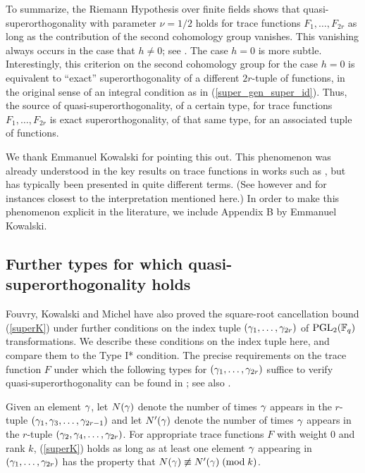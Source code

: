 \documentclass[oneside,11pt]{amsart}
\begin{document}
To summarize, the Riemann Hypothesis over finite fields  shows that quasi-superorthogonality with parameter $\nu=1/2$ holds for trace functions $F_1,\ldots, F_{2r}$ as long as the contribution of the second cohomology group vanishes. This vanishing always occurs  in the case that $h\neq 0$; see \cite[\S 4]{FKM15}. The case $h=0$ is more subtle.
Interestingly, this criterion on the second cohomology group  for the case $h=0$ is  equivalent to ``exact'' superorthogonality of a different $2r$-tuple of functions,  in the original sense of an integral condition as in (\ref{super_gen_super_id}).
 Thus, the source of quasi-superorthogonality, of a certain type, for  trace functions $F_1,\ldots, F_{2r}$ is exact superorthogonality, of that same type, for an associated tuple of functions.

 
We thank Emmanuel Kowalski for pointing this out. This phenomenon was already understood in the key results on trace functions in works such as \cite{KowRic14, FGKM14, FKM15,FKMS19}, but has typically been presented in quite different terms. 
(See  however  \cite[Remark 4.2 and Prop. 4.4.]{KowRic14} and \cite[Prop. 3.2]{FGKM14} for instances closest to the interpretation mentioned here.)
In order to make this phenomenon explicit in the literature, we include Appendix B by Emmanuel Kowalski.

 




 \subsection{Further types for which quasi-superorthogonality holds}
 Fouvry, Kowalski and Michel \cite{FKM15}   have also proved the square-root cancellation bound (\ref{superK}) under further conditions on the index tuple $(\gamma_1,\ldots, \gamma_{2r})$ of $\mathrm{PGL}_2(\mathbb{F}_q)$ transformations. We describe these conditions on the index tuple here, and compare them to the Type I* condition. The precise requirements on the trace function $F$ under which the following types for $(\gamma_1,\ldots,\gamma_{2r})$ suffice to verify  quasi-superorthogonality can be found in \cite[Thm. 1.5 and Cor. 1.6]{FKM15}; see also \cite[\S 14.1]{FKMS19}. 
 
 
Given an element $\gamma$, let $N(\gamma)$ denote the number of times $\gamma$ appears in the $r$-tuple $(\gamma_1,\gamma_3, \ldots, \gamma_{2r-1})$ and let $N'(\gamma)$ denote the number of times $\gamma$ appears in the $r$-tuple $(\gamma_2,\gamma_4, \ldots, \gamma_{2r})$. 
For appropriate trace functions $F$ with weight 0 and rank $k$,   (\ref{superK}) holds as long as at least one element $\gamma$ appearing in $(\gamma_1,\ldots, \gamma_{2r})$ has the property
that $N(\gamma) \not\equiv N'(\gamma) \; ( \text{mod} \; k)$. 
\end{document}
